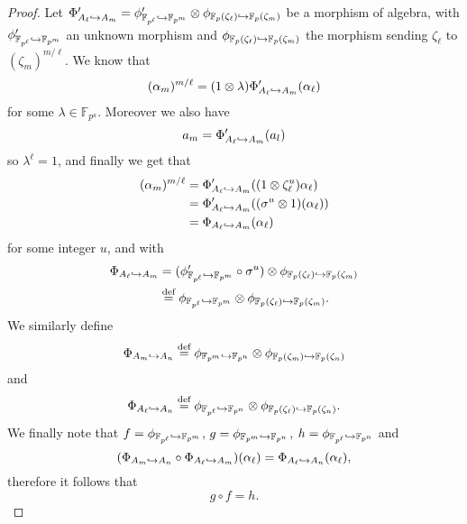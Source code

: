 \documentclass[a4paper,11pt]{article}
\begin{document}
\begin{proof}
  Let $\Phi_{A_\ell\hookrightarrow A_m}' =
\phi_{\mathbb{F}_{p^\ell}\hookrightarrow\mathbb{F}_{p^m}}'\otimes\phi_{\mathbb{F}_{p}(\zeta_\ell)\hookrightarrow\mathbb{F}_{p}(\zeta_m)}$
be a morphism of algebra, with $\phi_{\mathbb{F}_{p^\ell}\hookrightarrow\mathbb{F}_{p^m}}'$
an unknown morphism and 
$\phi_{\mathbb{F}_{p}(\zeta_\ell)\hookrightarrow\mathbb{F}_{p}(\zeta_m)}$ the morphism
sending $\zeta_\ell$ to $(\zeta_m)^{m/\ell}$. We know that
\[
  (\alpha_m)^{m/\ell} = (1\otimes\lambda)\Phi_{A_\ell\hookrightarrow A_m}'(\alpha_\ell) 
\]
for some $\lambda\in\mathbb{F}_{p^a}$. Moreover we also have 
\[
  a_m = \Phi_{A_\ell\hookrightarrow A_m}'(a_l)
\]
so $\lambda^\ell = 1$, and finally we get that
\begin{align*}
  (\alpha_m)^{m/\ell} &= \Phi_{A_\ell\hookrightarrow
  A_m}'((1\otimes\zeta_\ell^u)\alpha_\ell) \\
  &= \Phi_{A_\ell\hookrightarrow
  A_m}'((\sigma^u\otimes 1)(\alpha_\ell)) \\
  &= \Phi_{A_\ell\hookrightarrow A_m}(\alpha_\ell)
\end{align*}
for some integer $u$, and with
\begin{align*}
 \Phi_{A_\ell\hookrightarrow A_m} &=
(\phi_{\mathbb{F}_{p^\ell}\hookrightarrow\mathbb{F}_{p^m}}'\circ\sigma^u)\otimes\phi_{\mathbb{F}_{p}(\zeta_\ell)\hookrightarrow\mathbb{F}_{p}(\zeta_m)}\\
&\overset{\text{def}}{=}
\phi_{\mathbb{F}_{p^\ell}\hookrightarrow\mathbb{F}_{p^m}}\otimes\phi_{\mathbb{F}_{p}(\zeta_\ell)\hookrightarrow\mathbb{F}_{p}(\zeta_m)}.
\end{align*}
We similarly define 
\[
  \Phi_{A_m\hookrightarrow
  A_n}\overset{\text{def}}{=}\phi_{\mathbb{F}_{p^m}\hookrightarrow\mathbb{F}_{p^n}}\otimes\phi_{\mathbb{F}_{p}(\zeta_m)\hookrightarrow\mathbb{F}_{p}(\zeta_n)}
\]
and
\[
  \Phi_{A_\ell\hookrightarrow
  A_n}\overset{\text{def}}{=}\phi_{\mathbb{F}_{p^\ell}\hookrightarrow\mathbb{F}_{p^n}}\otimes\phi_{\mathbb{F}_{p}(\zeta_\ell)\hookrightarrow\mathbb{F}_{p}(\zeta_n)}.
\]
We finally note that $f = \phi_{\mathbb{F}_{p^\ell}\hookrightarrow\mathbb{F}_{p^m}}$, 
$g = \phi_{\mathbb{F}_{p^m}\hookrightarrow\mathbb{F}_{p^n}}$, 
$h = \phi_{\mathbb{F}_{p^\ell}\hookrightarrow\mathbb{F}_{p^n}}$ and
\[
(\Phi_{A_m\hookrightarrow A_n}\circ\Phi_{A_\ell\hookrightarrow A_m})(\alpha_\ell) = \Phi_{A_\ell\hookrightarrow
A_n}(\alpha_\ell),
\]
therefore it follows that
\[
  g\circ f = h.
\]




\end{proof}
\end{document}
